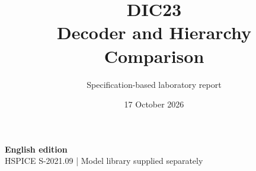 \documentclass[11pt,a4paper]{article}
\title{\color{accent}DIC23\\[4pt]Decoder and Hierarchy Comparison}
\author{Specification-based laboratory report}
\date{17 October 2026}
\begin{document}
\maketitle
\begin{center}\small\textbf{English edition}\\
HSPICE S-2021.09 \quad | \quad Model library supplied separately
\end{center}


\end{document}
